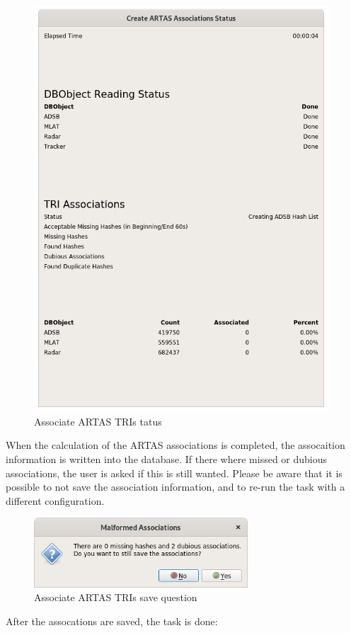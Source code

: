 \begin{figure}[H]
  \center
    \includegraphics[width=11cm]{figures/artas_assoc_status.png}
  \caption{Associate ARTAS TRIs tatus}
\end{figure}

When the calculation of the ARTAS associations is completed, the assocaition information is written into the database. If there where missed or dubious associations, the user is asked if this is still wanted. Please be aware that it is possible to not save the association information, and to re-run the task with a different configuration.

\begin{figure}[H]
  \center
    \includegraphics[width=8cm]{figures/artas_assoc_question.png}
  \caption{Associate ARTAS TRIs save question}
\end{figure}

After the assocations are saved, the task is done:

